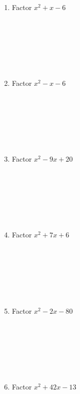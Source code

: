 \documentclass{article}
\begin{document}
\begin{minipage}[t]{0.45\textwidth}
    \begin{enumerate}
        \item Factor $x^2 + x - 6$
        \\\\\\\\\\\\\\
        \item Factor $x^2 - x - 6$
        \\\\\\\\\\\\\\
        \item Factor $x^2 - 9x + 20$
        \\\\\\\\\\\\\\
        \item Factor $x^2 + 7x + 6$
        \\\\\\\\\\\\\\
        \item Factor $x^2 - 2x - 80$
        \\\\\\\\\\\\\\
        \item Factor $x^2 + 42x - 13$
        
        
    \end{enumerate}
\end{minipage}%
\hfill
\end{document}
